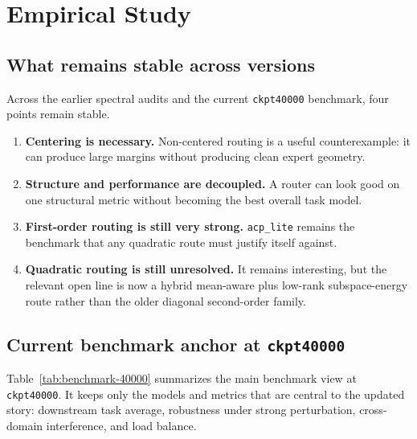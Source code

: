 \documentclass[11pt]{article}
\begin{document}
\section{Empirical Study}

\subsection{What remains stable across versions}

Across the earlier spectral audits and the current \texttt{ckpt40000} benchmark, four points remain stable.

\begin{enumerate}
    \item \textbf{Centering is necessary.} Non-centered routing is a useful counterexample: it can produce large margins without producing clean expert geometry.
    \item \textbf{Structure and performance are decoupled.} A router can look good on one structural metric without becoming the best overall task model.
    \item \textbf{First-order routing is still very strong.} \texttt{acp\_lite} remains the benchmark that any quadratic route must justify itself against.
    \item \textbf{Quadratic routing is still unresolved.} It remains interesting, but the relevant open line is now a hybrid mean-aware plus low-rank subspace-energy route rather than the older diagonal second-order family.
\end{enumerate}

\subsection{Current benchmark anchor at \texttt{ckpt40000}}

Table~\ref{tab:benchmark-40000} summarizes the main benchmark view at \texttt{ckpt40000}. It keeps only the models and metrics that are central to the updated story: downstream task average, robustness under strong perturbation, cross-domain interference, and load balance.
\end{document}
